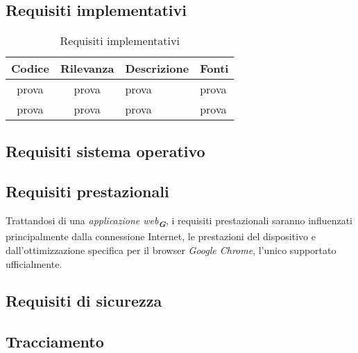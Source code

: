 \subsection{Requisiti implementativi}
\label{sec:Requisiti_implementativi}
\begin{table}[h!]
    \centering
    \renewcommand{\arraystretch}{1.6} %
    \begin{tabularx}{\textwidth}{|>{\centering\arraybackslash}c|>{\centering\arraybackslash}c|>{\centering\arraybackslash}X|>{\centering\arraybackslash}p{3cm}|} \hline
    \rowcolor[HTML]{FFD700} 
    \textbf{Codice} & \textbf{Rilevanza} & \textbf{Descrizione} & \textbf{Fonti} \\ \hline
    prova & prova & prova & prova \\ \hline
    prova & prova & prova & prova \\ \hline
    \end{tabularx}
    \caption{Requisiti implementativi}
    \label{tab:Requisiti_implementativi}
\end{table}

\subsection{Requisiti sistema operativo}

\subsection{Requisiti prestazionali}
\label{sec:req_prestazionali}
Trattandosi di una \emph{applicazione web}\textsubscript{\textit{\textbf{G}}}, i requisiti prestazionali saranno influenzati principalmente dalla connessione Internet, 
le prestazioni del dispositivo e dall'ottimizzazione specifica per il browser \emph{Google Chrome}, l'unico supportato ufficialmente.

\subsection{Requisiti di sicurezza}

\subsection{Tracciamento}

